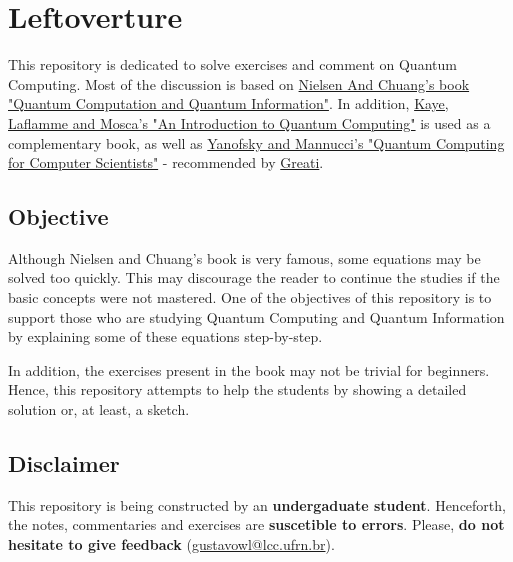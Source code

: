 \section{Leftoverture}
This repository is dedicated to solve exercises and comment on Quantum Computing. Most of the discussion is based on \href{https://www.cambridge.org/core/books/quantum-computation-and-quantum-information/01E10196D0A682A6AEFFEA52D53BE9AE}{Nielsen And Chuang's book "Quantum Computation and Quantum Information"}.
In addition, \href{https://books.google.com.br/books?hl=pt-BR&lr=&id=8jwVDAAAQBAJ&oi=fnd&pg=PR5&dq=an+introduction+quantum+computation+mosca&ots=1EgvgtQL_A&sig=YqURWZlJOHdatZHyly-cNPLhdxM#v=onepage&q=an\%20introduction\%20quantum\%20computation\%20mosca&f=false}{Kaye, Laflamme and Mosca's "An Introduction to Quantum Computing"}
is used as a complementary book, as well as \href{http://www.cambridge.org/gb/academic/subjects/computer-science/cryptography-cryptology-and-coding/quantum-computing-computer-scientists?format=HB}{Yanofsky and Mannucci's "Quantum Computing for Computer Scientists"}
- recommended by \href{http://vitorgreati.me/}{Greati}.

\subsection{Objective}
Although Nielsen and Chuang's book is very famous, some equations may be solved too quickly. This may discourage the reader to continue the studies if the basic concepts were not mastered. One of the objectives of this repository is to support those who are studying Quantum Computing and Quantum Information by explaining some of these equations step-by-step.

In addition, the exercises present in the book may not be trivial for beginners. Hence, this repository attempts to help the students by showing a detailed solution or, at least, a sketch.

\subsection{Disclaimer}
This repository is being constructed by an \textbf{undergaduate student}. Henceforth, the notes, commentaries and exercises are \textbf{suscetible to errors}. Please, \textbf{do not hesitate to give feedback} (\href{mailto:gustavowl@lcc.ufrn.br}{gustavowl@lcc.ufrn.br}).

\pagebreak
